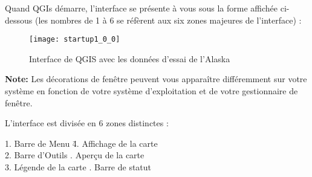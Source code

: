 %
%

Quand QGIs démarre, l'interface se présente à vous sous la forme affichée ci-dessous (les nombres de 1 à 6 se réfèrent aux six zones majeures de l'interface) :

\begin{figure}[ht]
   \begin{center}
   \caption{Interface de QGIS avec les données d'essai de l'Alaska \nixcaption}
  \label{fig:startup}
   \texttt{[image: startup1\_0\_0]}
\end{center} 
\end{figure}

\textbf{Note:} Les décorations de fenêtre peuvent vous apparaître différemment sur votre système en fonction de votre système d'exploitation et de votre gestionnaire de fenêtre.

%
%

L'interface est divisée en 6 zones distinctes :

\begin{tabbing}
1. Barre de Menu \hspace{3cm}\= 4. Affichage de la carte \\
2. Barre d'Outils \hspace{3cm}. Aperçu de la carte  \\
3. Légende de la carte \hspace{3cm}. Barre de statut   
\end{tabbing}

